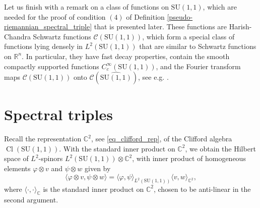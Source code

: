 \documentclass{amsart}
\theoremstyle{definition}
\theoremstyle{remark}
\DeclareMathOperator{\Cl}{Cl}
\numberwithin{equation}{section}
\begin{document}
Let us finish with a remark on a class of functions on $\mathrm{SU}(1,1)$, which are needed for the proof of condition $(4)$ of Definition \ref{pseudo-riemannian_spectral_triple} that is presented later. These functions are Harish-Chandra Schwartz functions $\mathcal{C}(\mathrm{SU}(1,1))$, which form a special class of functions lying densely in $L^2(\mathrm{SU}(1,1))$ that are similar to Schwartz functions on $\mathbb{R}^n$. In particular, they have fast decay properties, contain the smooth compactly supported functions $C^\infty_c(\mathrm{SU}(1,1))$, and the Fourier transform maps $\mathcal{C}(\mathrm{SU}(1,1))$ onto $\mathcal{C}(\widehat{\mathrm{SU}(1,1)})$, see e.g. \cite{wallach_1988}. 

\section{Spectral triples}\label{sec_spectral_triples}
Recall the representation $\mathbb{C}^2$, see \eqref{eq_clifford_rep}, of the Clifford algebra $\Cl(\mathrm{SU}(1,1))$. With the standard inner product on $\mathbb{C}^2$, we obtain the Hilbert space of $L^2$-spinors $L^2(\mathrm{SU}(1,1))\otimes\mathbb{C}^2$, with inner product of homogeneous elements $\varphi\otimes v$ and $\psi\otimes w$ given by
\begin{equation*}
    \langle\varphi\otimes v,\psi\otimes w\rangle=\langle \varphi,\psi\rangle_{L^2(\mathrm{SU}(1,1))}\langle v,w\rangle_{\mathbb{C}^2},
\end{equation*}
where $\langle\cdot,\cdot\rangle_\mathbb{C}$ is the standard inner product on $\mathbb{C}^2$, chosen to be anti-linear in the second argument.
\end{document}
